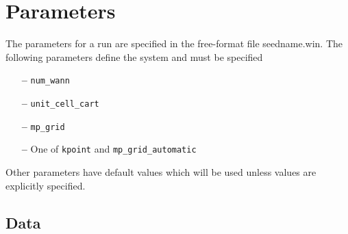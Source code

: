 \chapter{Parameters}

The parameters for a run are specified in the free-format file
seedname.win. The following parameters define the system and must be
specified

\begin{itemize}
\item[{\bf --}] \verb#num_wann#
\item[{\bf --}] \verb#unit_cell_cart#
\item[{\bf --}] \verb#mp_grid#
\item[{\bf --}] One of \verb#kpoint# and \verb#mp_grid_automatic#
\end{itemize}

Other parameters have default values which will be used unless values
are explicitly specified.



\section{Data}
\label{parameter_data}

